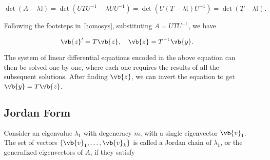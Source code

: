 \documentclass[english,a4paper,12pt]{report}
\begin{document}
\begin{equation}
    \det (A-\lambda \mathbb{I}) = \det (UTU^{-1} - \lambda U U^{-1}  ) = \det (U(T-\lambda \mathbb{I})U^{-1} ) = \det (T-\lambda \mathbb{I}).  
\end{equation}

Following the footsteps in \cref{homosys}, substituting \(A = UTU^{-1} \), we have

\begin{equation}
    \vb{z} ' = T\vb{z}, \quad \vb{z} = T^{-1} \vb{y}.
\end{equation}

The system of linear differential equations encoded in the above equation can then be solved one by one, where each one requires the results of all the subsequent solutions. After finding \(\vb{z}\), we can invert the equation to get \(\vb{y}  = T\vb{z} \).

\subsection{Jordan Form}

Consider an eigenvalue \(\lambda _{1} \) with degeneracy \(m\), with a single eigenvector \(\vb{v} _{1} \). The set of vectors \(\left\{ \vb{v}_1, \ldots , \vb{v}_k \right\}\) is called a Jordan chain of \(\lambda _{1} \), or the generalized eigenvectors of \(A\), if they satisfy
\end{document}
